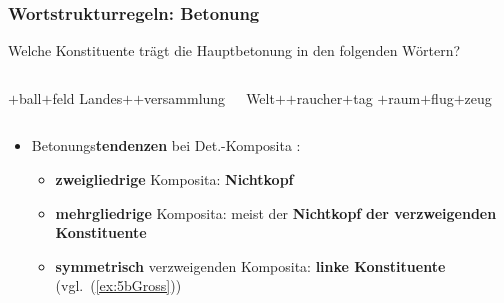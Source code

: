 \begin{frame}
\frametitle{Wortstrukturregeln: Betonung}

Welche Konstituente trägt die Hauptbetonung in den folgenden Wörtern?

\begin{columns}
	\ea\label{ex:5bFuss} $+$ball$+$feld
	\ex\label{ex:5bLandes} Landes$+$$+$versammlung
	\z 

	\ea\label{ex:5bWelt} Welt$+$$+$raucher$+$tag
	\ex\label{ex:5bGross} $+$raum$+$flug$+$zeug
	\z 
\end{columns}

\pause 

\begin{itemize}
	\item Betonungs\textbf{tendenzen} bei Det.-Komposita \citep[vgl.][131ff]{Grewendorf&Co91a}:
	\begin{itemize}
		
		\item \textbf{zweigliedrige} Komposita: \textbf{Nichtkopf}
	
		\item \textbf{mehrgliedrige} Komposita: meist der \textbf{Nichtkopf} \textbf{der verzweigenden Konstituente}
				
		\item \textbf{symmetrisch} verzweigenden Komposita: \textbf{linke Konstituente} (vgl.\ (\ref{ex:5bGross}))
		
		
	\end{itemize}
\end{itemize}


\end{frame}
